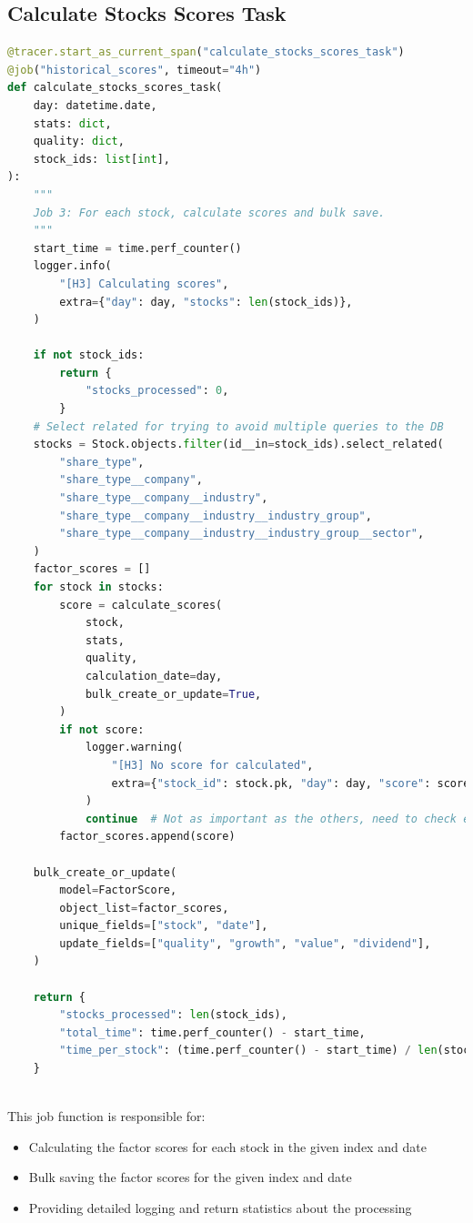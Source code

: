 \documentclass[11pt,english,a4paper,hidelinks]{book}
\begin{document}
\subsection{Calculate Stocks Scores Task}
\begin{lstlisting}[language=Python, caption=Calculate Stocks Scores Task, label={lst:calculate_stocks_scores_task}]
@tracer.start_as_current_span("calculate_stocks_scores_task")
@job("historical_scores", timeout="4h")
def calculate_stocks_scores_task(
    day: datetime.date,
    stats: dict,
    quality: dict,
    stock_ids: list[int],
):
    """
    Job 3: For each stock, calculate scores and bulk save.
    """
    start_time = time.perf_counter()
    logger.info(
        "[H3] Calculating scores",
        extra={"day": day, "stocks": len(stock_ids)},
    )

    if not stock_ids:
        return {
            "stocks_processed": 0,
        }
    # Select related for trying to avoid multiple queries to the DB
    stocks = Stock.objects.filter(id__in=stock_ids).select_related(
        "share_type",
        "share_type__company",
        "share_type__company__industry",
        "share_type__company__industry__industry_group",
        "share_type__company__industry__industry_group__sector",
    )
    factor_scores = []
    for stock in stocks:
        score = calculate_scores(
            stock,
            stats,
            quality,
            calculation_date=day,
            bulk_create_or_update=True,
        )
        if not score:
            logger.warning(
                "[H3] No score for calculated",
                extra={"stock_id": stock.pk, "day": day, "score": score},
            )
            continue  # Not as important as the others, need to check errors in DataDog
        factor_scores.append(score)

    bulk_create_or_update(
        model=FactorScore,
        object_list=factor_scores,
        unique_fields=["stock", "date"],
        update_fields=["quality", "growth", "value", "dividend"],
    )

    return {
        "stocks_processed": len(stock_ids),
        "total_time": time.perf_counter() - start_time,
        "time_per_stock": (time.perf_counter() - start_time) / len(stock_ids),
    }
    
\end{lstlisting}

\noindent This job function is responsible for:
\begin{itemize}
    \item Calculating the factor scores for each stock in the given index and date
    \item Bulk saving the factor scores for the given index and date
    \item Providing detailed logging and return statistics about the processing
\end{itemize}
\end{document}
